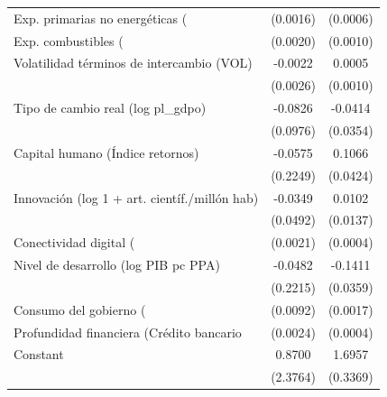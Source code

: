 \begin{table}[htbp]
\begin{tabular}{l*{2}{c}}
\addlinespace
Exp. primarias no energéticas (%
                    &    (0.0016)         &    (0.0006)         \\
\addlinespace
Exp. combustibles (%
                    &    (0.0020)         &    (0.0010)         \\
\addlinespace
Volatilidad términos de intercambio (VOL)&     -0.0022         &      0.0005         \\
                    &    (0.0026)         &    (0.0010)         \\
\addlinespace
Tipo de cambio real (log pl\_gdpo)&     -0.0826         &     -0.0414         \\
                    &    (0.0976)         &    (0.0354)         \\
\addlinespace
Capital humano (Índice retornos)&     -0.0575         &      0.1066\sym{**} \\
                    &    (0.2249)         &    (0.0424)         \\
\addlinespace
Innovación (log 1 + art. científ./millón hab)&     -0.0349         &      0.0102         \\
                    &    (0.0492)         &    (0.0137)         \\
\addlinespace
Conectividad digital (%
                    &    (0.0021)         &    (0.0004)         \\
\addlinespace
Nivel de desarrollo (log PIB pc PPA)&     -0.0482         &     -0.1411\sym{***}\\
                    &    (0.2215)         &    (0.0359)         \\
\addlinespace
Consumo del gobierno (%
                    &    (0.0092)         &    (0.0017)         \\
\addlinespace
Profundidad financiera (Crédito bancario %
                    &    (0.0024)         &    (0.0004)         \\
\addlinespace
Constant            &      0.8700         &      1.6957\sym{***}\\
                    &    (2.3764)         &    (0.3369)         \\

\end{tabular}
\end{table}
